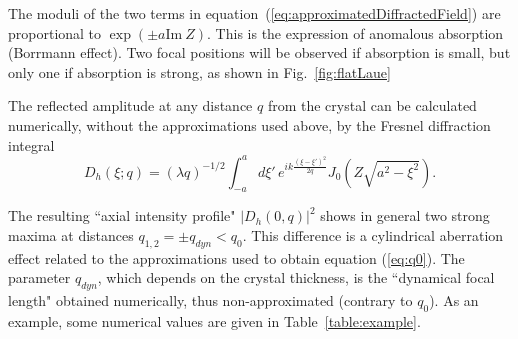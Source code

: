 \documentclass[preprint]{iucr}              %
\newcommand{\inred}[1]{{\color{red}#1}}
\begin{document}
\inred{The moduli of the two terms in equation~(\ref{eq:approximatedDiffractedField}) are proportional to $\exp(\pm a \text{Im}~Z)$. This is the expression of anomalous absorption (Borrmann effect). Two focal positions will be observed if absorption is small, but only one if absorption is strong, as shown in Fig.~\ref{fig:flatLaue}
}


The reflected amplitude at any distance $q$ from the crystal can be calculated numerically, without the approximations used above, by the Fresnel diffraction integral
\begin{equation}
\label{eq:Fresnel}
    D_h(\xi; q) = (\lambda q)^{-1/2} \int_{-a}^a d\xi'  \, e^{i k 
    \frac{(\xi-\xi')^2}{2 q}} 
    J_0(Z\sqrt{a^2-\xi^2}).
\end{equation}


The resulting ``axial intensity profile" $|D_h(0,q)|^2$ shows in general two strong maxima at distances $q_{1,2}=\pm q_{dyn} < q_0$. This difference is a cylindrical aberration effect related to the approximations used to obtain equation (\ref{eq:q0}). The parameter $q_{dyn}$\inred{, which depends on the crystal thickness,} is the ``dynamical focal length" obtained numerically, thus non-approximated (contrary to $q_0$).
As an example, some numerical values are given in Table~\ref{table:example}. 
\end{document}
